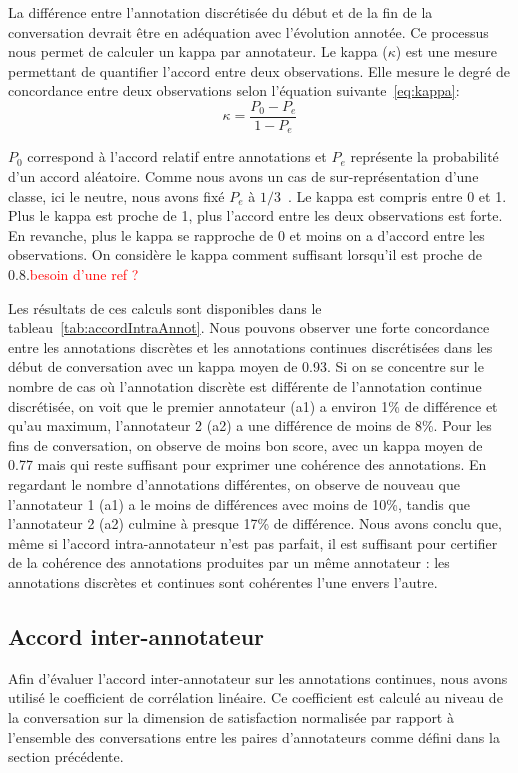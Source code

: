 La différence entre l'annotation discrétisée du début et de la fin de la conversation devrait être en adéquation avec l'évolution annotée.
Ce processus nous permet de calculer un kappa par annotateur.
Le kappa ($\kappa$) est une mesure permettant de quantifier l'accord entre deux observations. Elle mesure le degré de concordance entre deux observations selon l'équation suivante~\ref{eq:kappa}:
\begin{equation}
    \kappa = \dfrac{P_0 - P_e}{1 - P_e}
    \label{eq:kappa}
\end{equation}

$P_0$ correspond à l'accord relatif entre annotations et $P_e$ représente la probabilité d'un accord aléatoire. Comme nous avons un cas de sur-représentation d'une classe, ici le neutre, nous avons fixé $P_e$ à $1/3$~\cite{Callejas2008}.
Le kappa est compris entre 0 et 1. Plus le kappa est proche de 1, plus l'accord entre les deux observations est forte. En revanche, plus le kappa se rapproche de 0 et moins on a d'accord entre les observations. On considère le kappa comment suffisant lorsqu'il est proche de 0.8.\textcolor{red}{besoin d'une ref ?}


Les résultats de ces calculs sont disponibles dans le tableau~\ref{tab:accordIntraAnnot}. Nous pouvons observer une forte concordance entre les annotations discrètes et les annotations continues discrétisées dans les début de conversation avec un kappa moyen de 0.93. Si on se concentre sur le nombre de cas où l'annotation discrète est différente de l'annotation continue discrétisée, on voit que le premier annotateur (a1) a environ 1\% de différence et qu'au maximum, l'annotateur 2 (a2) a une différence de moins de 8\%.
Pour les fins de conversation, on observe de moins bon score, avec un kappa moyen de 0.77 mais qui reste suffisant pour exprimer une cohérence des annotations. En regardant le nombre d'annotations différentes, on observe de nouveau que l'annotateur 1 (a1) a le moins de différences avec moins de 10\%, tandis que l'annotateur 2 (a2) culmine à presque 17\% de différence.
Nous avons conclu que, même si l'accord intra-annotateur n'est pas parfait, il est suffisant pour certifier de la cohérence des annotations produites par un même annotateur : les annotations discrètes et continues sont cohérentes l'une envers l'autre.

\subsection{Accord inter-annotateur}
Afin d’évaluer l’accord inter-annotateur sur les annotations continues, nous avons utilisé le coefficient de corrélation linéaire. Ce coefficient est calculé au niveau de la conversation sur la dimension de satisfaction normalisée par rapport à l’ensemble des conversations entre les paires d’annotateurs comme défini dans la section précédente.

